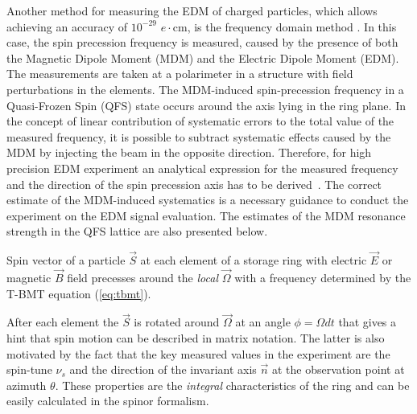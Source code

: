\documentclass[%
  aps,
  pra,
  preprint,
  a4paper,
  amsmath,
  amssymb,
  floatfix,
  longbibliography,
  superscriptaddress
]{revtex4-2}
\begin{document}
Another method for measuring the EDM of charged particles, which allows achieving an accuracy of $10^{-29}$ $e\cdot$cm,
is the frequency domain method \cite{Senichev:2017amn,Aksentev:2020irr,Aksentev:2017nlq}. In this case, the spin precession frequency is measured, caused by the presence of both the Magnetic Dipole Moment (MDM) and the Electric Dipole Moment (EDM). The measurements are taken at a polarimeter in a structure with field perturbations in the elements. The MDM-induced spin-precession frequency in a Quasi-Frozen Spin (QFS)  \cite{Senichev:2022ide} state occurs around the axis lying in the ring plane. In the concept of linear contribution of systematic errors to the total value of the measured frequency, it is possible to
subtract systematic effects caused by the MDM by injecting
the beam in the opposite direction. Therefore, for high precision EDM experiment an analytical expression for the measured frequency and the direction of the spin precession axis has to be derived~\cite{Melnikov:2024wsn,Aksentev:2021fsy}. The correct estimate of the MDM-induced systematics is a necessary guidance to conduct the experiment on the EDM signal evaluation. The estimates of the MDM resonance strength in the QFS lattice are also presented below.

Spin vector of a particle $\vec{S}$ at each element of a storage ring with electric $\vec{E}$ or magnetic $\vec{B}$ field precesses around the \textit{local} $\vec{\Omega}$ with a frequency determined by the T-BMT equation (\ref{eq:tbmt}).

After each element the $\vec{S}$ is rotated around $\vec{\Omega}$ at an angle $\phi=\Omega dt$ that gives a hint that spin motion can be described in matrix notation. The latter is also motivated by the fact that the key measured values in the experiment are the spin-tune $\nu_s$ and the direction of the invariant axis $\vec{n}$ at the observation point at azimuth $\theta$. These properties are the \textit{integral} characteristics of the ring and can be easily calculated in the spinor formalism. 
\end{document}
